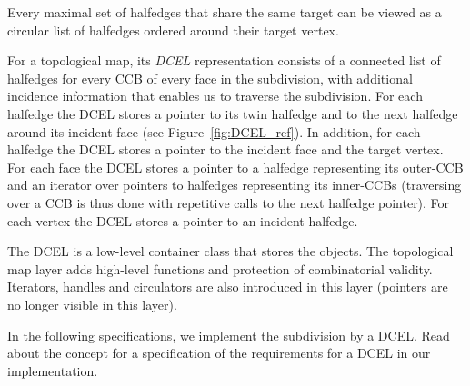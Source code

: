 Every maximal set of halfedges that share the same target can be viewed 
as a circular list of halfedges ordered %
around their target vertex.

For a topological map, its {\em DCEL} representation consists of a
connected list of halfedges for every CCB of every face in the
subdivision, with additional incidence information that enables us to
traverse the subdivision. %
For each halfedge the DCEL
stores a pointer to its twin halfedge and to the next
halfedge around its incident face (see Figure~\ref{fig:DCEL_ref}). In
addition, for each halfedge the DCEL stores a pointer to the incident
face and the target vertex.
For each face the DCEL stores a pointer to a halfedge representing
its outer-CCB and an iterator over pointers to halfedges representing
its inner-CCBs (traversing over a CCB is thus done with repetitive
calls to the next halfedge pointer).
For each vertex the DCEL stores a pointer to an incident halfedge. 

The DCEL is a low-level container class that stores the objects.
The topological map layer adds high-level functions and protection of
combinatorial validity. Iterators, handles and circulators are also
introduced in this layer (pointers are no longer visible in this layer).

In the following
specifications, we implement the subdivision by a DCEL. Read about the concept
for a specification of the requirements for a DCEL in our implementation.

